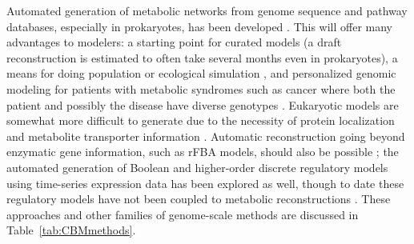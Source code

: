 \documentclass[phd,tocprelim,draft]{cornell}
\newcommand{\citep}[1]{\cite{#1}}
\begin{document}
Automated generation of metabolic networks from genome sequence and
pathway databases, especially in prokaryotes, has been developed
\citep{Seaver2012, Aziz2012, Henry2011, Faria2013}.  This will offer
many advantages to modelers: a starting point for curated models (a
draft reconstruction is estimated to often take several months even in
prokaryotes), a means for doing population or ecological simulation
\citep{Klitgord2011}, and personalized genomic modeling for patients
with metabolic syndromes such as cancer where both the patient and
possibly the disease have diverse genotypes \citep{Locasale2012,
Folger2011}.  Eukaryotic models are somewhat more difficult to
generate due to the necessity of protein localization and metabolite
transporter information \citep{Seaver2012}. Automatic reconstruction
going beyond enzymatic gene information, such as rFBA models, should
also be possible \citep{Covert2001, Herrgard2006c}; the automated
generation of Boolean and higher-order discrete regulatory models
using time-series expression data has been explored as well, though to
date these regulatory models have not been coupled to metabolic
reconstructions \citep{Dingel2009, Dimitrova2009, Stigler2007a,
Jarrah2007}. These approaches and other families of genome-scale
methods are discussed in Table~\ref{tab:CBMmethods}.
\end{document}
